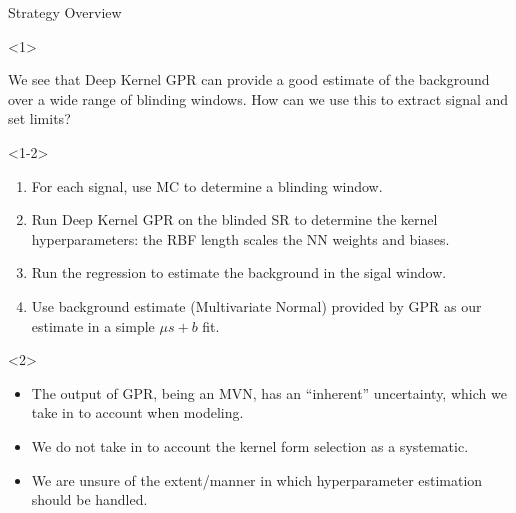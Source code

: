 \documentclass[10pt]{beamer}
\begin{document}
\begin{frame}{Strategy Overview}
  \begin{onlyenv}<1>
    \begin{block}{}
      We see that Deep Kernel GPR can provide a good estimate of the background over a wide range of blinding windows. How can we use this to extract signal and set limits?
    \end{block}
  \end{onlyenv}

  \begin{onlyenv}<1-2>
    \begin{enumerate}
    \item For each signal, use MC to determine a blinding window. 
    \item Run Deep Kernel GPR on the blinded SR to determine the kernel hyperparameters: the RBF length scales the NN weights and biases. 
    \item Run the regression to estimate the background in the sigal window.
    \item\label{item:5} Use background estimate (Multivariate Normal) provided by GPR as our estimate in a simple $\mu s + b$ fit.
    \end{enumerate}
  \end{onlyenv}

  \begin{onlyenv}<2>
    \begin{block}{}
      \begin{itemize}
      \item The output of GPR, being an MVN, has an ``inherent'' uncertainty, which we take in to account when modeling.
      \item We do not take in to account the kernel form selection as a systematic.
      \item We are unsure of the extent/manner in which hyperparameter estimation should be handled. 
      \end{itemize}
    \end{block}
  \end{onlyenv}

  
\end{frame}
\end{document}
